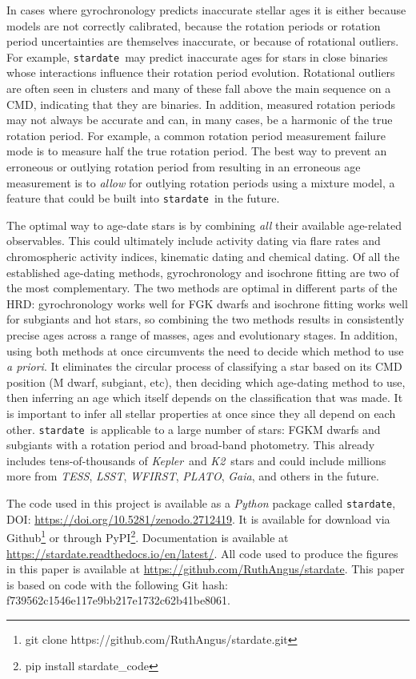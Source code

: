 \documentclass[useAMS, usenatbib, preprint, 12pt]{aastex}
\newcommand{\eg}{{\it e.g.}}
\newcommand{\kepler}{{\it Kepler}}
\newcommand{\Ktwo}{{\it K2}}
\newcommand{\ktwo}{\Ktwo}
\newcommand{\tess}{{\it TESS}}
\newcommand{\lsst}{{\it LSST}}
\newcommand{\wfirst}{{\it WFIRST}}
\newcommand{\plato}{{\it PLATO}}
\newcommand{\gaia}{{\it Gaia}}
\newcommand{\sd}{{\tt stardate}}
\begin{document}
In cases where gyrochronology predicts inaccurate stellar ages it is either
because models are not correctly calibrated, because the rotation periods or
rotation period uncertainties are themselves inaccurate, or because of
rotational outliers.
For example, \sd\ may predict inaccurate ages for stars in close binaries
whose interactions influence their rotation period evolution.
Rotational outliers are often seen in clusters \citep[see \eg][]{douglas2016,
rebull2016, douglas2017, rebull2017} and many of these fall above the main
sequence on a CMD, indicating that they are binaries.
In addition, measured rotation periods may not always be accurate and can, in
many cases, be a harmonic of the true rotation period.
For example, a common rotation period measurement failure mode is to measure
half the true rotation period.
The best way to prevent an erroneous or outlying rotation period from
resulting in an erroneous age measurement is to {\it allow} for outlying
rotation periods using a mixture model, a feature that could be built into
\sd\ in the future.

The optimal way to age-date stars is by combining {\it all} their available
age-related observables.
This could ultimately include activity dating via flare rates and
chromospheric activity indices, kinematic dating and chemical dating.
Of all the established age-dating methods, gyrochronology and isochrone
fitting are two of the most complementary.
The two methods are optimal in different parts of the HRD:
gyrochronology works well for FGK dwarfs and isochrone fitting works well for
subgiants and hot stars, so combining the two methods results in consistently
precise ages across a range of masses, ages and evolutionary stages.
In addition, using both methods at once circumvents the need to decide which
method to use {\it a priori}.
It eliminates the circular process of classifying a star based on its CMD
position (M dwarf, subgiant, etc), then deciding which age-dating method to
use, then inferring an age which itself depends on the classification that was
made.
It is important to infer all stellar properties at once since they all depend
on each other.
\sd\ is applicable to a large number of stars: FGKM dwarfs and subgiants with
a rotation period and broad-band photometry.
This already includes tens-of-thousands of \kepler\ and \ktwo\ stars and could
include millions more from \tess, \lsst, \wfirst, \plato, \gaia, and others in
the future.

The code used in this project is available as a {\it Python} package called
\sd, DOI: \url{ https://doi.org/10.5281/zenodo.2712419}.
It is available for download via Github\footnote{git clone
https://github.com/RuthAngus/stardate.git} or through
PyPI\footnote{pip install stardate\_code}.
Documentation is available at \url{https://stardate.readthedocs.io/en/latest/}.
All code used to produce the figures in this paper is available at
\url{https://github.com/RuthAngus/stardate}.
This paper is based on code with the following Git hash:
f739562c1546e117e9bb217e1732c62b41be8061.
\end{document}
